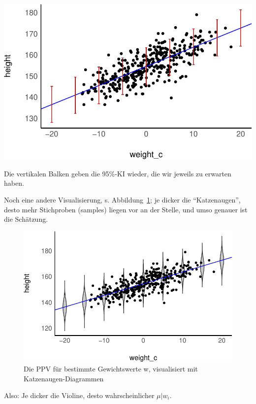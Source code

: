 \documentclass[
  a4paper,
  DIV=11]{scrreprt}
\theoremstyle{definition}
\theoremstyle{remark}
\begin{document}
\includegraphics{./lineare-modelle_files/figure-pdf/mus-d2-1.pdf}

Die vertikalen Balken geben die 95\%-KI wieder, die wir jeweils zu
erwarten haben.

Noch eine andere Visualisierung, s. Abbildung~\ref{fig-katzenaugen}; je
dicker die ``Katzenaugen'', desto mehr Stichproben (samples) liegen vor
an der Stelle, und umso genauer ist die Schätzung.

\begin{figure}

{\centering \includegraphics{./lineare-modelle_files/figure-pdf/fig-katzenaugen-1.pdf}

}

\caption{\label{fig-katzenaugen}Die PPV für bestimmte Gewichtswerte w,
visualisiert mit Katzenaugen-Diagrammen}

\end{figure}

Also: Je dicker die Violine, desto wahrscheinlicher \(\mu | w_i\).
\end{document}
